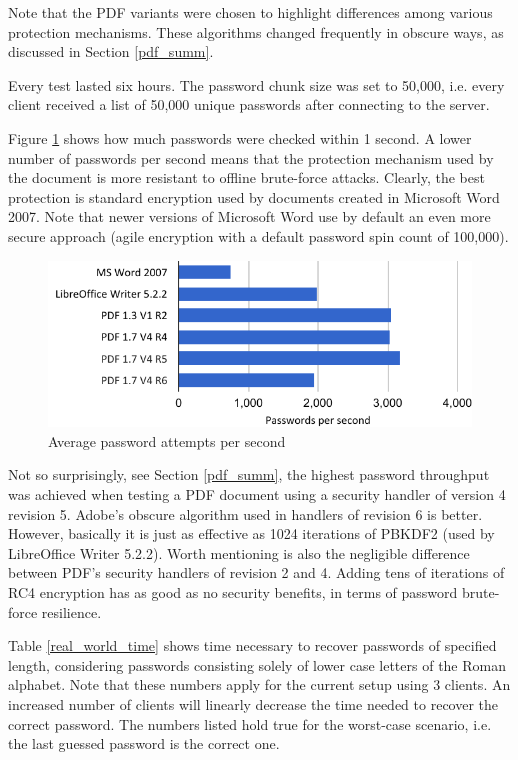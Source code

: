 \documentclass[11pt,oneside]{fithesis2}
\begin{document}
Note that the PDF variants were chosen to highlight differences among various protection mechanisms. These algorithms changed frequently in obscure ways, as discussed in Section \ref{pdf_summ}.

Every test lasted six hours. The password chunk size was set to 50,000, i.e. every client received a list of 50,000 unique passwords after connecting to the server. 

Figure \ref{average_speed} shows how much passwords were checked within 1 second. A lower number of passwords per second means that the protection mechanism used by the document is more resistant to offline brute-force attacks. Clearly, the best protection is standard encryption used by documents created in Microsoft Word 2007. Note that newer versions of Microsoft Word use by default an even more secure approach (agile encryption with a default password spin count of 100,000).

\begin{figure}[ht]
	\centering
	\includegraphics[width=1\textwidth]{figures/average_speed.pdf}
	\caption{Average password attempts per second}
	\label{average_speed}
\end{figure}

Not so surprisingly, see Section \ref{pdf_summ}, the highest password throughput was achieved when testing a PDF document using a security handler of version 4 revision 5. Adobe's obscure algorithm used in handlers of revision 6 is better. However, basically it is just as effective as 1024 iterations of PBKDF2 (used by LibreOffice Writer 5.2.2).  Worth mentioning is also the negligible difference between PDF's security handlers of revision 2 and 4. Adding tens of iterations of RC4 encryption has as good as no security benefits, in terms of password brute-force resilience. 

Table \ref{real_world_time} shows time necessary to recover passwords of specified length, considering passwords consisting solely of lower case letters of the Roman alphabet. Note that these numbers apply for the current setup using 3 clients. An increased number of clients will linearly decrease the time needed to recover the correct password. The numbers listed hold true for the worst-case scenario, i.e. the last guessed password is the correct one.
\end{document}
